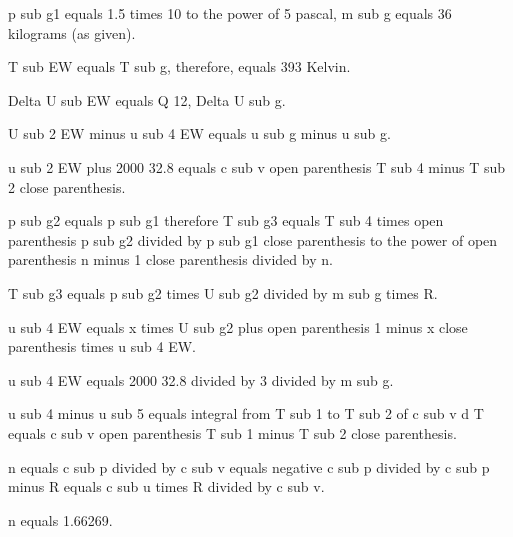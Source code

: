 p sub g1 equals 1.5 times 10 to the power of 5 pascal, m sub g equals 36 kilograms (as given).

T sub EW equals T sub g, therefore, equals 393 Kelvin.

Delta U sub EW equals Q 12, Delta U sub g.

U sub 2 EW minus u sub 4 EW equals u sub g minus u sub g.

u sub 2 EW plus 2000 32.8 equals c sub v open parenthesis T sub 4 minus T sub 2 close parenthesis.

p sub g2 equals p sub g1 therefore T sub g3 equals T sub 4 times open parenthesis p sub g2 divided by p sub g1 close parenthesis to the power of open parenthesis n minus 1 close parenthesis divided by n.

T sub g3 equals p sub g2 times U sub g2 divided by m sub g times R.

u sub 4 EW equals x times U sub g2 plus open parenthesis 1 minus x close parenthesis times u sub 4 EW.

u sub 4 EW equals 2000 32.8 divided by 3 divided by m sub g.

u sub 4 minus u sub 5 equals integral from T sub 1 to T sub 2 of c sub v d T equals c sub v open parenthesis T sub 1 minus T sub 2 close parenthesis.

n equals c sub p divided by c sub v equals negative c sub p divided by c sub p minus R equals c sub u times R divided by c sub v.

n equals 1.66269.